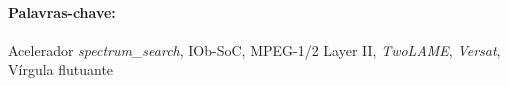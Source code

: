 \paragraph{\hspace{0.5cm} \Large{Palavras-chave:}} Acelerador \textit{spectrum\_search}, IOb-SoC, MPEG-1/2 Layer II, \textit{TwoLAME}, \textit{Versat}, Vírgula flutuante